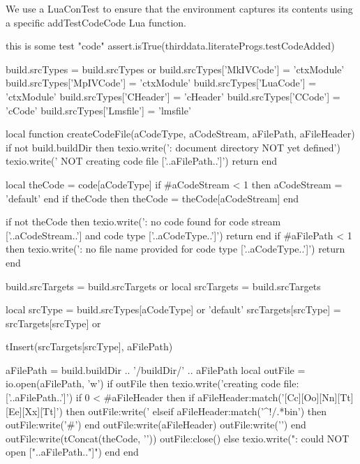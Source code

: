 We use a LuaConTest to ensure that the  environment 
captures its contents using a specific addTestCodeCode Lua function. 

\startConTest
\begingroup
  \startTestCode
    this is some test "code"
  \stopTestCode
  \startLuaConTest
    assert.isTrue(thirddata.literateProgs.testCodeAdded)
  \stopLuaConTest
\endgroup
\stopConTest
\stopTestCase

\startLuaCode

build.srcTypes = build.srcTypes or { }
build.srcTypes['MkIVCode'] = 'ctxModule'
build.srcTypes['MpIVCode'] = 'ctxModule'
build.srcTypes['LuaCode']  = 'ctxModule'
build.srcTypes['CHeader']  = 'cHeader'
build.srcTypes['CCode']    = 'cCode'
build.srcTypes['Lmsfile']  = 'lmsfile'

local function createCodeFile(aCodeType,
                              aCodeStream,
                              aFilePath,
                              aFileHeader)
  if not build.buildDir then
    texio.write('\nERROR: document directory NOT yet defined\n')
    texio.write('       NOT creating code file ['..aFilePath..']\n\n')
    return
  end

  local theCode = code[aCodeType]
  if #aCodeStream < 1 then aCodeStream = 'default' end
  if theCode then theCode = theCode[aCodeStream] end

  if not theCode then
    texio.write('\nERROR: no code found for code stream ['..aCodeStream..'] and code type ['..aCodeType..']\n\n')
    return
  end
  if #aFilePath < 1 then
    texio.write('\nERROR: no file name provided for code type ['..aCodeType..']\n\n')
    return
  end

  build.srcTargets = build.srcTargets or { }
  local srcTargets = build.srcTargets

  local srcType       = build.srcTypes[aCodeType] or 'default'
  srcTargets[srcType] = srcTargets[srcType] or { }

  tInsert(srcTargets[srcType], aFilePath)

  aFilePath = build.buildDir .. '/buildDir/' .. aFilePath
  local outFile = io.open(aFilePath, 'w')
  if outFile then
    texio.write('creating code file: ['..aFilePath..']\n')
    if 0 < #aFileHeader then
      if aFileHeader:match('[Cc][Oo][Nn][Tt][Ee][Xx][Tt]') then
        outFile:write('%
      elseif aFileHeader:match('^!/.*bin') then
        outFile:write('#')
      end
      outFile:write(aFileHeader)
      outFile:write('\n\n')
    end
    outFile:write(tConcat(theCode, '\n\n'))
    outFile:close()
  else
    texio.write("\nERROR: could NOT open ["..aFilePath.."]\n")
  end
end

